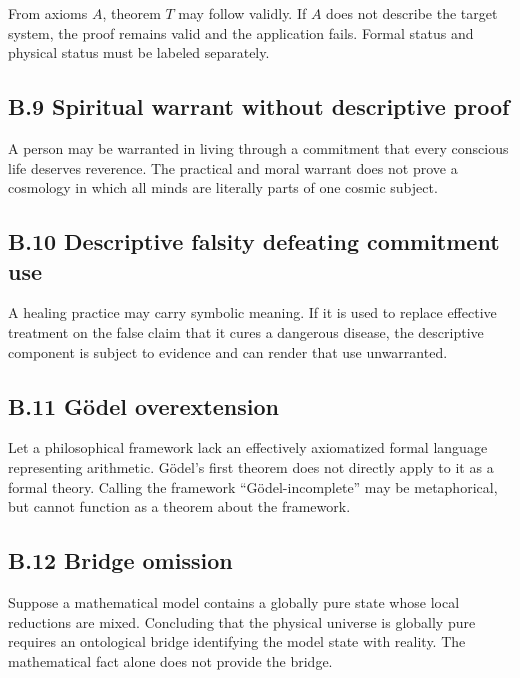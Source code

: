 \documentclass[
  11pt,
]{article}
\begin{document}
From axioms \(A\), theorem \(T\) may follow validly. If \(A\) does not
describe the target system, the proof remains valid and the application
fails. Formal status and physical status must be labeled separately.

\subsection{B.9 Spiritual warrant without descriptive
proof}\label{b.9-spiritual-warrant-without-descriptive-proof}

A person may be warranted in living through a commitment that every
conscious life deserves reverence. The practical and moral warrant does
not prove a cosmology in which all minds are literally parts of one
cosmic subject.

\subsection{B.10 Descriptive falsity defeating commitment
use}\label{b.10-descriptive-falsity-defeating-commitment-use}

A healing practice may carry symbolic meaning. If it is used to replace
effective treatment on the false claim that it cures a dangerous
disease, the descriptive component is subject to evidence and can render
that use unwarranted.

\subsection{B.11 Gödel overextension}\label{b.11-guxf6del-overextension}

Let a philosophical framework lack an effectively axiomatized formal
language representing arithmetic. Gödel's first theorem does not
directly apply to it as a formal theory. Calling the framework
``Gödel-incomplete'' may be metaphorical, but cannot function as a
theorem about the framework.

\subsection{B.12 Bridge omission}\label{b.12-bridge-omission}

Suppose a mathematical model contains a globally pure state whose local
reductions are mixed. Concluding that the physical universe is globally
pure requires an ontological bridge identifying the model state with
reality. The mathematical fact alone does not provide the bridge.
\end{document}

